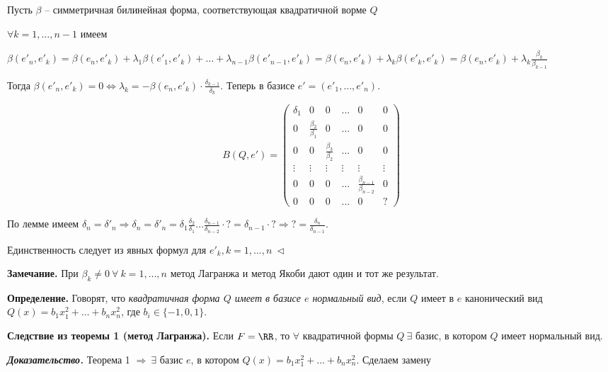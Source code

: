 Пусть $\beta$ -- симметричная билинейная форма, соответствующая квадратичной ворме $Q$

$\forall k = 1, \dots, n-1$ имеем 

$\beta(e'_n, e'_k) = \beta(e_n, e'_k) + \lambda_1 \beta(e'_1, e'_k) + \dots + \lambda_{n-1} \beta(e'_{n-1}, e'_k) = \beta(e_n, e'_k) + \lambda_k \beta(e'_k, e'_k) =\beta(e_n, e'_k) + \lambda_k \frac{\beta_k}{\beta_{k-1}} $

\bigskip
Тогда $\beta(e'_n, e'_k) = 0 \Leftrightarrow \lambda_k = -\beta(e_n, e'_k) \cdot \frac{\delta_{k-1}}{\delta_{k}}$. Теперь в базисе $e' = (e'_1, \dots, e'_n)$.

\begin{equation*} B(Q, e') = \begin{pmatrix} \delta_1 & 0 & 0 & \dots & 0 & 0 \\ 0 & \frac{\beta_2}{\beta_1} & 0 & \dots & 0 & 0 \\ 0 & 0 & \frac{\beta_3}{\beta_2} & \dots & 0 & 0 \\ \vdots & \vdots & \vdots & \vdots & \vdots & \vdots \\ 0 & 0 & 0 & \dots & \frac{\beta_{n-1}}{\beta_{n-2}} & 0 \\ 0 & 0 & 0 & \dots & 0 & ? \end{pmatrix}
\end{equation*}

\bigskip
По лемме имеем $\delta_n = \delta'_n \Rightarrow \delta_n = \delta'_n = \delta_1 \frac{\delta_2}{\delta_1} \dots \frac{\delta_{n-1}}{\delta_{n-2}} \cdot ? = \delta_{n-1} \cdot ? \Rightarrow ? = \frac{\delta_n}{\delta_{n-1}}$.

Единственность следует из явных формул для $e'_k, k = 1, \dots, n \ \lhd$

\bigskip
\textbf{Замечание.} При $\beta_k \neq 0 \ \forall \ k = 1, \dots, n$ метод Лагранжа и метод Якоби дают один и тот же результат. 

\bigskip
\textbf{Определение.} Говорят, что \textit{квадратичная форма $Q$ имеет в базисе $e$ нормальный вид}, если $Q$ имеет в $e$ канонический вид $Q(x) = b_1 x_1^2 + \dots + b_n x_n^2$, где $b_i \in \{-1, 0, 1\}$.

\bigskip
\textbf{Следствие из теоремы 1 (метод Лагранжа).} Если $F = \RR$, то $\forall$ квадратичной формы $Q \ \exists$ базис, в котором $Q$ имеет нормальный вид.

\bigskip
\textbf{\textit{Доказательство.}} Теорема 1 $\Rightarrow \ \exists$ базис $e$, в котором $Q(x) = b_1 x_1^2 + \dots + b_n x_n^2$. Сделаем замену

